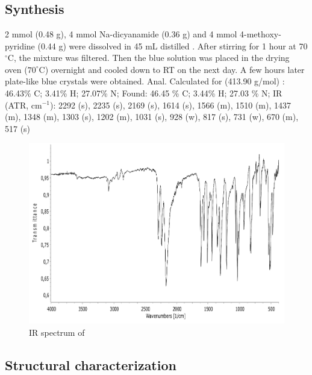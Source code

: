 \section{}
\subsection{Synthesis}
2 mmol  (0.48 g), 4 mmol  Na-dicyanamide (0.36 g) and  4 mmol 4-methoxy-pyridine (0.44 g) were dissolved in 45 mL distilled . After stirring for 1 hour at 70$^\circ$C, the mixture was filtered. Then the blue solution was placed in the drying oven ($70^\circ$C) overnight and  cooled down to RT on the next day. A few hours later plate-like  blue crystals were obtained.
Anal. Calculated for  (413.90 g/mol) : 46.43\% C; 3.41\% H; 27.07\% N;
Found: 46.45 \% C; 3.44\% H; 27.03 \% N;
IR (ATR, cm$^{-1}$):  2292 (s), 2235 (s), 2169 (s), 1614 (s), 1566 (m), 1510 (m), 1437 (m), 1348 (m), 1303 (s), 1202 (m), 1031 (s), 928 (w), 817 (s), 731 (w), 670 (m), 517 (s)


\begin{figure}[h!]
\centering
\includegraphics[scale=0.9, width=1\textwidth]{figures/CuD4MOP-IR.pdf}
\caption{IR spectrum of }
\end{figure}

\subsection{Structural characterization}

